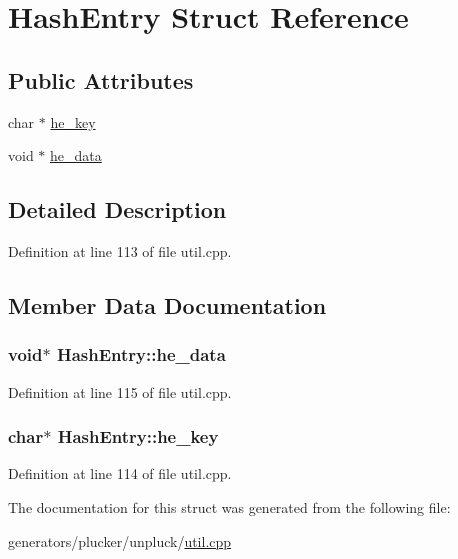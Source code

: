 \hypertarget{structHashEntry}{\section{Hash\+Entry Struct Reference}
\label{structHashEntry}
}
\subsection*{Public Attributes}
\begin{DoxyCompactItemize}
\item 
char $\ast$ \hyperlink{structHashEntry_aae8728a5a900b3f5d7ad43642c88ddb4}{he\+\_\+key}
\item 
void $\ast$ \hyperlink{structHashEntry_a32c228dc26a77332e89dc3abc333a086}{he\+\_\+data}
\end{DoxyCompactItemize}


\subsection{Detailed Description}


Definition at line 113 of file util.\+cpp.



\subsection{Member Data Documentation}
\hypertarget{structHashEntry_a32c228dc26a77332e89dc3abc333a086}{
\subsubsection[{he\+\_\+data}]{\setlength{\rightskip}{0pt plus 5cm}void$\ast$ Hash\+Entry\+::he\+\_\+data}}\label{structHashEntry_a32c228dc26a77332e89dc3abc333a086}


Definition at line 115 of file util.\+cpp.

\hypertarget{structHashEntry_aae8728a5a900b3f5d7ad43642c88ddb4}{
\subsubsection[{he\+\_\+key}]{\setlength{\rightskip}{0pt plus 5cm}char$\ast$ Hash\+Entry\+::he\+\_\+key}}\label{structHashEntry_aae8728a5a900b3f5d7ad43642c88ddb4}


Definition at line 114 of file util.\+cpp.



The documentation for this struct was generated from the following file\+:\begin{DoxyCompactItemize}
\item 
generators/plucker/unpluck/\hyperlink{plucker_2unpluck_2util_8cpp}{util.\+cpp}\end{DoxyCompactItemize}
